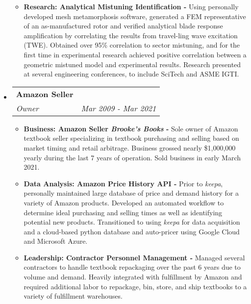 \documentclass[letterpaper,11pt]{article}
\makeatletter
\newcommand{\resitem}[1]{\item #1 \vspace{-2pt}}
\newcommand{\ressubheading}[4]{
\begin{tabular*}{7.0in}{l@{\extracolsep{\fill}}r}
		\textbf{#1} & #2 \\
		\textit{#3} & \textit{#4} \\
\end{tabular*}\vspace{-6pt}}
\makeatother
\begin{document}
\begin{itemize}
\begin{itemize}
    \resitem{\textbf{Research: Analytical Mistuning Identification -} Using personally developed mesh metamorphosis software, generated a FEM representative of an as-manufactured rotor and verified analytical blade response amplification by correlating the results from travel-ling wave excitation (TWE).  Obtained over 95\% correlation to sector mistuning, and for the first time in experimental research achieved positive correlation between a geometric mistuned model and experimental results.  Research presented at several engineering conferences, to include SciTech and ASME IGTI.}
  \end{itemize}

\item
  \ressubheading{Amazon Seller}{}{Owner}{Mar 2009 - Mar 2021}
  \begin{itemize}
    \resitem{\textbf{Business: Amazon Seller \textit{Brooke's Books} - } Sole owner of Amazon textbook seller specializing in textbook purchasing and selling based on market timing and retail arbitrage.  Business grossed nearly \$1,000,000 yearly during the last 7 years of operation.  Sold business in early March 2021.}
    \resitem{\textbf{Data Analysis: Amazon Price History API - } Prior to \textit{keepa}, personally maintained large database of price and demand history for a variety of Amazon products.  Developed an automated workflow to determine ideal purchasing and selling times as well as identifying potential new products.  Transitioned to using \textit{keepa} for data acquisition and a cloud-based python database and auto-pricer using Google Cloud and Microsoft Azure.}
    \resitem{\textbf{Leadership: Contractor Personnel Management - } Managed several contractors to handle textbook repackaging over the past 6 years due to volume and demand.  Heavily integrated with fulfillment by Amazon and required additional labor to repackage, bin, store, and ship textbooks to a variety of fulfillment warehouses.}
  \end{itemize}


\end{itemize}
\end{document}
